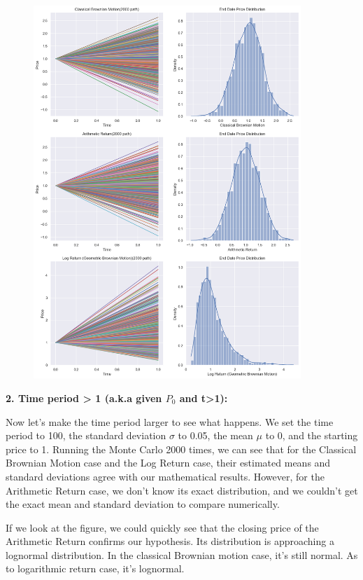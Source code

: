 \documentclass[11pt,en]{elegantpaper}
\begin{document}
\begin{figure}[htbp] 
    \centering 
    \includegraphics[width=0.9\textwidth]{./image/Problem1_1.png} 
\end{figure}

\newpage

\textbf{2. Time period > 1 (a.k.a given $P_0$ and t>1):}

Now let's make the time period larger to see what happens. We set the time period to 100, the standard deviation $\sigma$ to 0.05, the mean $\mu$ to 0, and the starting price to 1. Running the Monte Carlo 2000 times, we can see that for the Classical Brownian Motion case and the Log Return case, their estimated means and standard deviations agree with our mathematical results. However, for the Arithmetic Return case, we don't know its exact distribution, and we couldn't get the exact mean and standard deviation to compare numerically. 

If we look at the figure, we could quickly see that the closing price of the Arithmetic Return confirms our hypothesis. Its distribution is approaching a lognormal distribution. In the classical Brownian motion case, it's still normal. As to logarithmic return case, it's lognormal.
\end{document}
